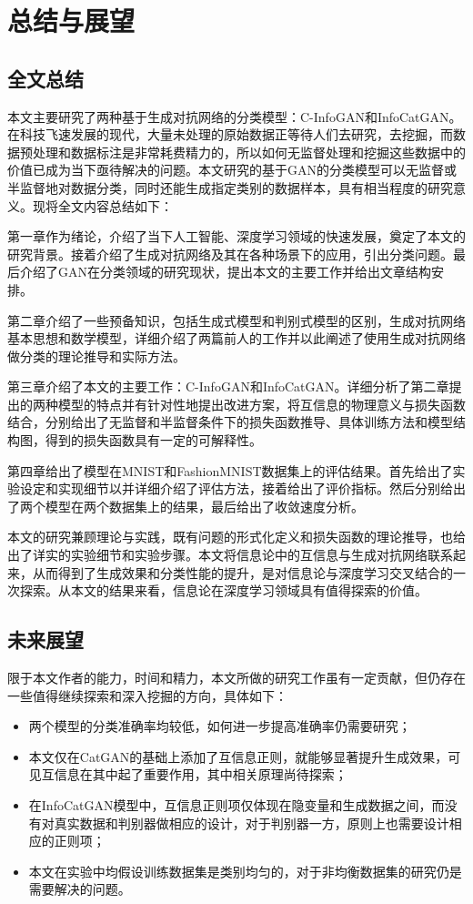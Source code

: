 \chapter{总结与展望}\label{chap:summ}

\section{全文总结}
本文主要研究了两种基于生成对抗网络的分类模型：C-InfoGAN和InfoCatGAN。在科技飞速发展的现代，大量未处理的原始数据正等待人们去研究，去挖掘，而数据预处理和数据标注是非常耗费精力的，所以如何无监督处理和挖掘这些数据中的价值已成为当下亟待解决的问题。本文研究的基于GAN的分类模型可以无监督或半监督地对数据分类，同时还能生成指定类别的数据样本，具有相当程度的研究意义。现将全文内容总结如下：

第一章作为绪论，介绍了当下人工智能、深度学习领域的快速发展，奠定了本文的研究背景。接着介绍了生成对抗网络及其在各种场景下的应用，引出分类问题。最后介绍了GAN在分类领域的研究现状，提出本文的主要工作并给出文章结构安排。

第二章介绍了一些预备知识，包括生成式模型和判别式模型的区别，生成对抗网络基本思想和数学模型，详细介绍了两篇前人的工作并以此阐述了使用生成对抗网络做分类的理论推导和实际方法。

第三章介绍了本文的主要工作：C-InfoGAN和InfoCatGAN。详细分析了第二章提出的两种模型的特点并有针对性地提出改进方案，将互信息的物理意义与损失函数结合，分别给出了无监督和半监督条件下的损失函数推导、具体训练方法和模型结构图，得到的损失函数具有一定的可解释性。

第四章给出了模型在MNIST和FashionMNIST数据集上的评估结果。首先给出了实验设定和实现细节以并详细介绍了评估方法，接着给出了评价指标。然后分别给出了两个模型在两个数据集上的结果，最后给出了收敛速度分析。

本文的研究兼顾理论与实践，既有问题的形式化定义和损失函数的理论推导，也给出了详实的实验细节和实验步骤。本文将信息论中的互信息与生成对抗网络联系起来，从而得到了生成效果和分类性能的提升，是对信息论与深度学习交叉结合的一次探索。从本文的结果来看，信息论在深度学习领域具有值得探索的价值。

\section{未来展望}

限于本文作者的能力，时间和精力，本文所做的研究工作虽有一定贡献，但仍存在一些值得继续探索和深入挖掘的方向，具体如下：
\begin{itemize}
  \item 两个模型的分类准确率均较低，如何进一步提高准确率仍需要研究；
  \item 本文仅在CatGAN的基础上添加了互信息正则，就能够显著提升生成效果，可见互信息在其中起了重要作用，其中相关原理尚待探索；
  \item 在InfoCatGAN模型中，互信息正则项仅体现在隐变量和生成数据之间，而没有对真实数据和判别器做相应的设计，对于判别器一方，原则上也需要设计相应的正则项；
  \item 本文在实验中均假设训练数据集是类别均匀的，对于非均衡数据集的研究仍是需要解决的问题。
\end{itemize}
